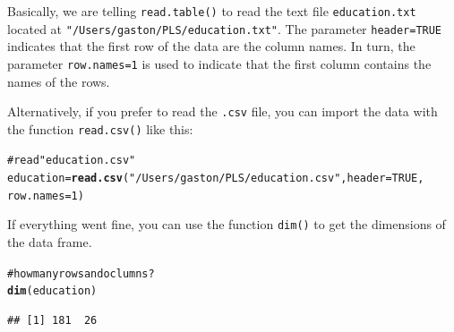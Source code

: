 \documentclass[12pt]{book}\usepackage{graphicx, color}
\makeatletter
\newcommand{\hlfunctioncall}[1]{\textcolor[rgb]{0.501960784313725,0,0.329411764705882}{\textbf{#1}}}%
\newcommand{\hlstring}[1]{\textcolor[rgb]{0.6,0.6,1}{#1}}%
\newcommand{\hlcomment}[1]{\textcolor[rgb]{0.180392156862745,0.6,0.341176470588235}{#1}}%
\newenvironment{kframe}{%
 \def\at@end@of@kframe{}%
 \ifinner\ifhmode%
  \def\at@end@of@kframe{\end{minipage}}%
  \begin{minipage}{\columnwidth}%
 \fi\fi%
 \def\FrameCommand##1{\hskip\@totalleftmargin \hskip-\fboxsep
 \colorbox{shadecolor}{##1}\hskip-\fboxsep
     \hskip-\linewidth \hskip-\@totalleftmargin \hskip\columnwidth}%
 \MakeFramed {\advance\hsize-\width
   \@totalleftmargin\z@ \linewidth\hsize
   \@setminipage}}%
 {\par\unskip\endMakeFramed%
 \at@end@of@kframe}
\newenvironment{knitrout}{}{} %
\newcommand{\code}[1]{\texttt{#1}}
\makeatother
\begin{document}
Basically, we are telling \code{read.table()} to read the text file \code{education.txt} located at \code{"/Users/gaston/PLS/education.txt"}. The parameter \code{header=TRUE} indicates that the first row of the data are the column names. In turn, the parameter \code{row.names=1} is used to indicate that the first column contains the names of the rows.

Alternatively, if you prefer to read the \code{.csv} file, you can import the data with the function \code{read.csv()} like this:
\begin{knitrout}
\color{fgcolor}\begin{kframe}
\begin{alltt}
\hlcomment{# read "education.csv"}
education = \hlfunctioncall{read.csv}(\hlstring{"/Users/gaston/PLS/education.csv"}, header = TRUE, 
                     row.names = 1)
\end{alltt}
\end{kframe}
\end{knitrout}






If everything went fine, you can use the function \code{dim()} to get the dimensions of the data frame. 
\begin{knitrout}
\color{fgcolor}\begin{kframe}
\begin{alltt}
\hlcomment{# how many rows and oclumns?}
\hlfunctioncall{dim}(education)
\end{alltt}
\begin{verbatim}
## [1] 181  26
\end{verbatim}
\end{kframe}
\end{knitrout}
\end{document}
